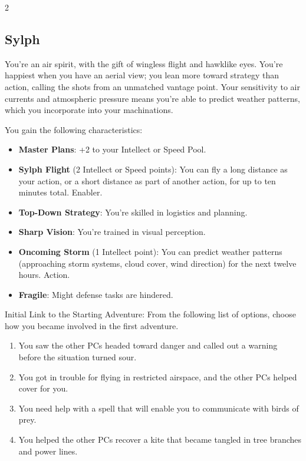 \begin{multicols}{2}
\subsection{Sylph}

You’re an air spirit, with the gift of wingless flight and hawklike eyes. You’re happiest when you have an aerial view; you lean more toward strategy than action, calling the shots from an unmatched vantage point. Your sensitivity to air currents and atmospheric pressure means you’re able to predict weather patterns, which you incorporate into your machinations.

You gain the following characteristics:

\begin{itemize}
\item \textbf{Master Plans}: +2 to your Intellect or Speed Pool.
\item \textbf{Sylph Flight} (2 Intellect or Speed points): You can fly a long distance as your action, or a short distance as part of another action, for up to ten minutes total. Enabler.
\item \textbf{Top-Down Strategy}: You’re skilled in logistics and planning.
\item \textbf{Sharp Vision}: You’re trained in visual perception.
\item \textbf{Oncoming Storm} (1 Intellect point): You can predict weather patterns (approaching storm systems, cloud cover, wind direction) for the next twelve hours. Action.
\item \textbf{Fragile}: Might defense tasks are hindered.
\end{itemize}

Initial Link to the Starting Adventure: From the following list of options, choose how you became involved in the first adventure.

\begin{enumerate}
\item You saw the other PCs headed toward danger and called out a warning before the situation turned sour.
\item You got in trouble for flying in restricted airspace, and the other PCs helped cover for you.
\item You need help with a spell that will enable you to communicate with birds of prey.
\item You helped the other PCs recover a kite that became tangled in tree branches and power lines.
\end{enumerate}


\end{multicols}
